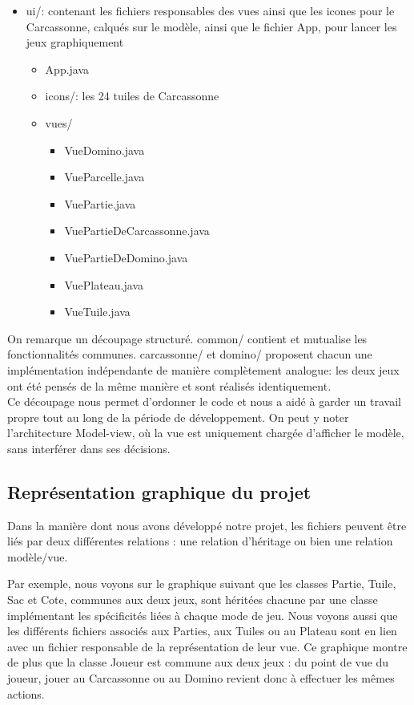 \documentclass{article}
\begin{document}
\begin{itemize}
    \item ui/: contenant les fichiers responsables des vues ainsi que les icones pour le Carcassonne, calqués sur le modèle, ainsi que le fichier App, pour lancer les jeux graphiquement
    \begin{itemize}
        \item App.java
        \item icons/: les 24 tuiles de Carcassonne
        \item vues/
        \begin{itemize}        
        \item VueDomino.java
        \item VueParcelle.java
        \item VuePartie.java
        \item VuePartieDeCarcassonne.java
        \item VuePartieDeDomino.java
        \item VuePlateau.java
        \item VueTuile.java
    \end{itemize}
    \end{itemize}
\end{itemize}

On remarque un découpage structuré. common/ contient et mutualise les fonctionnalités communes. carcassonne/ et domino/ proposent chacun une implémentation indépendante de manière complètement analogue: les deux jeux ont été pensés de la même manière et sont réalisés identiquement.\\
Ce découpage nous permet d'ordonner le code et nous a aidé à garder un travail propre tout au long de la période de développement. On peut y noter l'architecture Model-view, où la vue est uniquement chargée d'afficher le modèle, sans interférer dans ses décisions.

\subsection{Représentation graphique du projet}
Dans la manière dont nous avons développé notre projet, les fichiers peuvent être liés par deux différentes relations : une relation d'héritage ou bien une relation modèle/vue. 

Par exemple, nous voyons sur le graphique suivant que les classes Partie, Tuile, Sac et Cote, communes aux deux jeux, sont héritées chacune par une classe implémentant les spécificités liées à chaque mode de jeu. Nous voyons aussi que les différents fichiers associés aux Parties, aux Tuiles ou au Plateau sont en lien avec un fichier responsable de la représentation de leur vue. Ce graphique montre de plus que la classe Joueur est commune aux deux jeux : du point de vue du joueur, jouer au Carcassonne ou au Domino revient donc à effectuer les mêmes actions.
\end{document}
